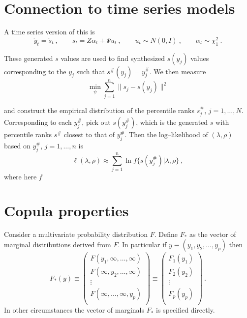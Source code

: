\documentclass[a4paper,12pt]{article}
\begin{document}
\section{Connection to time series models}
A time series version of this is
$$
\check y_t=\check s_t\ , \qquad s_t=Z \alpha_t + \Psi u_t\ , \qquad u_t\sim N(0,I)\ , \qquad \alpha_t\sim \chi^2_1\ .
$$




These generated $s$ values are used to find synthesized $s(y_j)$ values corresponding to the $y_j$  such that $s^\#(y_j)=y_j^\#$.  We then measure
$$
\min_\psi \sum_{j=1}^n\|s_j-s(y_j)\|^2
$$


 and construct the empirical distribution of the percentile ranks $s_j^\#$, $j=1,\ldots,N$.  Corresponding to each $y_j^\#$, pick out
$s(y_j^\#)$, which is the generated $s$ with percentile ranks $s^\#$ closest to that of $y_j^\#$.
Then the log--likelihood of $(\lambda,\rho)$ based on  $y_j^\#$, $j=1,\ldots,n$ is
$$
\ell(\lambda,\rho) \approx \sum_{j=1}^n \ln f\{s(y_j^\#)|\lambda,\rho\}\ ,
$$
where here $f$










\section{Copula properties}

Consider a multivariate probability distribution $F$.  Define $F_*$ as the vector of marginal distributions derived from $F$.  In particular if $y\equiv(y_1,y_2,\ldots, y_p)$ then
$$
F_*(y) \equiv \left(
           \begin{array}{c}
             F(y_1,\infty,\ldots,\infty) \\
             F(\infty,y_2,\ldots,\infty) \\
             \vdots \\
             F(\infty,\ldots,\infty,y_p) \\
           \end{array}
         \right)\equiv \left(
           \begin{array}{c}
             F_1(y_1) \\
             F_2(y_2) \\
             \vdots \\
             F_p(y_p) \\
           \end{array}
         \right)\ .
$$
In other circumstances the vector of marginals $F_*$ is specified directly.
\end{document}
